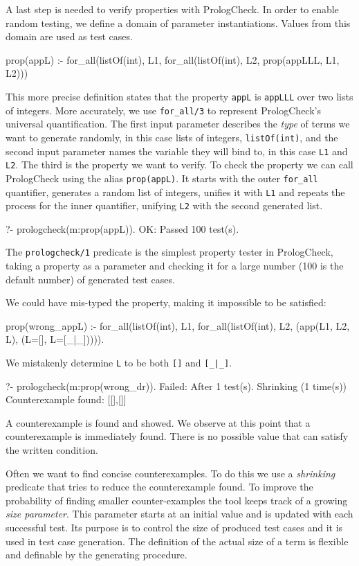 \documentclass[runningheads,a4paper]{llncs}
\newcommand{\yap}[1]{\lstinline[style=yap]{#1}}
\newcommand{\plqc}[0]{{\sf PrologCheck}}
\begin{document}
A last step is needed to verify properties with \plqc{}.
%
In order to enable random testing, we define a domain of parameter
instantiations.
%
Values from this domain are used as test cases.
%
\begin{yapcode}
 prop(appL) :- for_all(listOf(int), L1, for_all(listOf(int), L2,
                   prop({appLLL, L1, L2})))
\end{yapcode}


This more precise definition states that the property \yap{appL} is \yap{appLLL}
over two lists of integers.
%
More accurately, we use \yap{for_all/3} to represent \plqc{}'s universal quantification.
%
The first input parameter describes the \emph{type} of terms we want to
generate randomly, in this case lists of integers,
\yap{listOf(int)}, 
and the second input parameter names the variable they will bind to, in this case
\yap{L1} and \yap{L2}.
%
The third is the property we want to verify.
%
To check the property we can call \plqc{} using the alias
\yap{prop(appL)}.
%
It starts with the outer \yap{for_all} quantifier, generates a random
list of integers, unifies it with \yap{L1} and repeats the process for
the inner quantifier, unifying \yap{L2} with the second generated list.
%
\begin{yapcode}
   ?- prologcheck(m:prop(appL)).
 OK: Passed 100 test(s).
\end{yapcode}
%
The \yap{prologcheck/1} predicate is the simplest property tester in
\plqc{}, taking a property as a parameter and checking it for a large
number (100 is the default number) of generated test cases.



We could have mis-typed the property, making it impossible to be satisfied:
%
\begin{yapcode}
 prop(wrong_appL) :- for_all(listOf(int), L1,
   for_all(listOf(int), L2, (app(L1, L2, L), (L=[], L=[_|_])))).
\end{yapcode}
%
We mistakenly determine \yap{L} to be both  \yap{[]} and  \yap{[_|_]}.
%
\begin{yapcode}
   ?- prologcheck(m:prop(wrong_dr)).
 Failed: After 1 test(s).
 Shrinking (1 time(s))
 Counterexample found: [[],[]]
\end{yapcode}
A counterexample is found and showed.
%
We observe at this point that a counterexample is immediately found.
%
There is no possible value that can satisfy the written condition.



Often we want to find concise counterexamples.
%
To do this we use a \emph{shrinking} predicate that tries to reduce the
counterexample found.
%
To improve the probability of finding smaller counter-examples the tool
keeps track of a growing \emph{size parameter}.
%
This parameter  starts at an initial value and is updated with each
successful test.
%
Its purpose is to control the size of produced test cases and it is used
in test case generation.
%
The definition of the actual size of a term is flexible and definable by
the generating procedure. 
\end{document}
